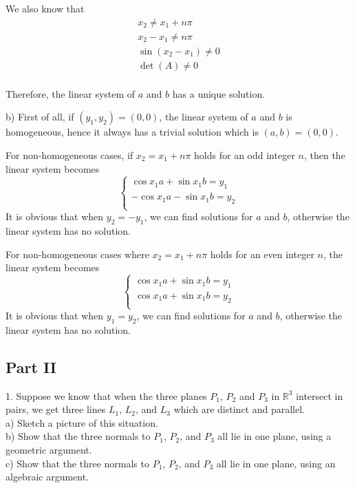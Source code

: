 \documentclass{article}
\begin{document}
We also know that
\begin{gather*}
  x_2 \neq x_1 + n\pi \\
  x_2 - x_1 \neq n\pi \\
  \sin (x_2 - x_1) \neq 0 \\
  \det(A) \neq 0 \\
\end{gather*}

Therefore, the linear system of $a$ and $b$ has a unique solution.

b)
First of all, if $(y_1, y_2) = (0, 0)$, the linear system of $a$ and $b$ is 
homogeneous, hence it always has a trivial solution which is $(a, b) = (0, 0)$.

For non-homogeneous cases, if $x_2 = x_1 + n\pi$ holds for an odd integer $n$, 
then the linear system becomes
\begin{equation*}
  \begin{cases}
    \cos x_1 a + \sin x_1 b = y_1 \\
    -\cos x_1 a - \sin x_1 b = y_2 \\
  \end{cases}
\end{equation*}
It is obvious that when $y_2 = -y_1$, we can find solutions for $a$ and $b$, 
otherwise the linear system has no solution.

For non-homogeneous cases where $x_2 = x_1 + n\pi$ holds for an even integer 
$n$, the linear system becomes
\begin{equation*}
  \begin{cases}
    \cos x_1 a + \sin x_1 b = y_1 \\
    \cos x_1 a + \sin x_1 b = y_2 \\
  \end{cases}
\end{equation*}
It is obvious that when $y_1 = y_2$, we can find solutions for $a$ and $b$, 
otherwise the linear system has no solution.

\begin{center}
\section*{Part II}
\end{center}

\bigskip

1. Suppose we know that when the three planes $P_1$, $P_2$ and $P_3$ in 
$\mathbb{R}^3$ intersect in pairs, we get three lines $L_1$, $L_2$, and $L_3$ 
which are distinct and parallel. \\
a) Sketch a picture of this situation. \\
b) Show that the three normals to $P_1$, $P_2$, and $P_3$ all lie in one plane, 
using a geometric argument. \\
c) Show that the three normals to $P_1$, $P_2$, and $P_3$ all lie in one plane,
using an algebraic argument.
\end{document}
